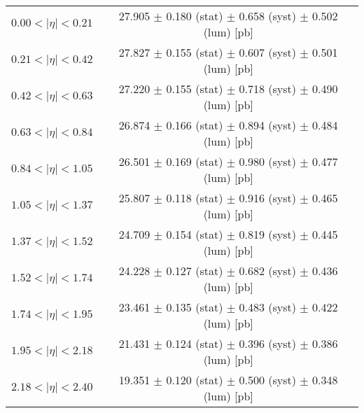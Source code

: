 \begin{tabular}{lc}
\hline
$0.00 < |\eta| <0.21$          & 27.905 $\pm$ 0.180 (stat) $\pm$ 0.658 (syst) $\pm$ 0.502 (lum) [pb]  \\
$0.21 < |\eta| <0.42$          & 27.827 $\pm$ 0.155 (stat) $\pm$ 0.607 (syst) $\pm$ 0.501 (lum) [pb]  \\
$0.42 < |\eta| <0.63$          & 27.220 $\pm$ 0.155 (stat) $\pm$ 0.718 (syst) $\pm$ 0.490 (lum) [pb]  \\
$0.63 < |\eta| <0.84$          & 26.874 $\pm$ 0.166 (stat) $\pm$ 0.894 (syst) $\pm$ 0.484 (lum) [pb]  \\
$0.84 < |\eta| <1.05$          & 26.501 $\pm$ 0.169 (stat) $\pm$ 0.980 (syst) $\pm$ 0.477 (lum) [pb]  \\
$1.05 < |\eta| <1.37$          & 25.807 $\pm$ 0.118 (stat) $\pm$ 0.916 (syst) $\pm$ 0.465 (lum) [pb]  \\
$1.37 < |\eta| <1.52$          & 24.709 $\pm$ 0.154 (stat) $\pm$ 0.819 (syst) $\pm$ 0.445 (lum) [pb]  \\
$1.52 < |\eta| <1.74$          & 24.228 $\pm$ 0.127 (stat) $\pm$ 0.682 (syst) $\pm$ 0.436 (lum) [pb]  \\
$1.74 < |\eta| <1.95$          & 23.461 $\pm$ 0.135 (stat) $\pm$ 0.483 (syst) $\pm$ 0.422 (lum) [pb]  \\
$1.95 < |\eta| <2.18$          & 21.431 $\pm$ 0.124 (stat) $\pm$ 0.396 (syst) $\pm$ 0.386 (lum) [pb]  \\
$2.18 < |\eta| <2.40$          & 19.351 $\pm$ 0.120 (stat) $\pm$ 0.500 (syst) $\pm$ 0.348 (lum) [pb]  \\
\hline
\end{tabular}
